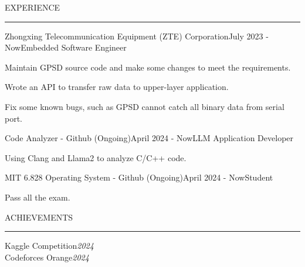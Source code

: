 \documentclass{cv} %
\renewenvironment{rSection}[1]{
\sectionskip
\textcolor{RoyalPurple}{\MakeUppercase{#1}}
\sectionlineskip
\hrule
\begin{list}{}{
\setlength{\leftmargin}{1.5em}
}
\item[]
}{
\end{list}
}
\begin{document}

\begin{rSection}{Experience}

  \begin{rSubsection}{Zhongxing Telecommunication Equipment (ZTE) Corporation}{July 2023 - Now}{Embedded Software Engineer}{}
    \item Maintain GPSD source code and make some changes to meet the requirements.
    \item Wrote an API to transfer raw data to upper-layer application.
    \item Fix some known bugs, such as GPSD cannot catch all binary data from serial port.
  \end{rSubsection}


  \begin{rSubsection}{Code Analyzer - Github (Ongoing)}{April 2024 - Now}{LLM Application Developer}{}
    \item Using Clang and Llama2 to analyze C/C++ code.
  \end{rSubsection}


  \begin{rSubsection}{MIT 6.828 Operating System - Github (Ongoing)}{April 2024 - Now}{Student}{}
    \item Pass all the exam.
  \end{rSubsection}

\end{rSection}



\begin{rSection}{Achievements} \itemsep -2pt
  {Kaggle Competition}\hfill {\em 2024} \\
  {Codeforces Orange}\hfill {\em 2024}
\end{rSection}
\end{document}
